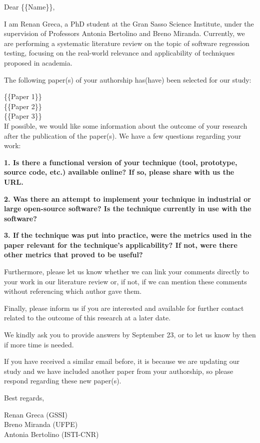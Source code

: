 \begin{tcolorbox}
\small
Dear \{\{Name\}\},

I am Renan Greca, a PhD student at the Gran Sasso Science Institute, under the supervision of Professors Antonia Bertolino and Breno Miranda. Currently, we are performing a systematic literature review on the topic of software regression testing, focusing on the real-world relevance and applicability of techniques proposed in academia.

The following paper(s) of your authorship has(have) been selected for our study:

\{\{Paper 1\}\}\\
\{\{Paper 2\}\}\\
\{\{Paper 3\}\}\\

If possible, we would like some information about the outcome of your research after the publication of the paper(s). We have a few questions regarding your work:

\textbf{1. Is there a functional version of your technique (tool, prototype, source code, etc.) available online? If so, please share with us the URL.}

\textbf{2. Was there an attempt to implement your technique in industrial or large open-source software? Is the technique currently in use with the software?}

\textbf{3. If the technique was put into practice, were the metrics used in the paper relevant for the technique’s applicability? If not, were there other metrics that proved to be useful?}

Furthermore, please let us know whether we can link your comments directly to your work in our literature review or, if not, if we can mention these comments without referencing which author gave them.

Finally, please inform us if you are interested and available for further contact related to the outcome of this research at a later date.

We kindly ask you to provide answers by September 23, or to let us know by then if more time is needed.

If you have received a similar email before, it is because we are updating our study and we have included another paper from your authorship, so please respond regarding these new paper(s).

Best regards,

Renan Greca (GSSI)\\
Breno Miranda (UFPE)\\
Antonia Bertolino (ISTI-CNR)\\
\end{tcolorbox}

